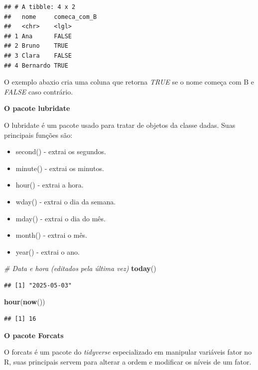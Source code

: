 \documentclass[
]{book}
\newenvironment{Shaded}{\begin{snugshade}}{\end{snugshade}}
\newcommand{\CommentTok}[1]{\textcolor[rgb]{0.56,0.35,0.01}{\textit{#1}}}
\newcommand{\FunctionTok}[1]{\textcolor[rgb]{0.13,0.29,0.53}{\textbf{#1}}}
\newcommand{\NormalTok}[1]{#1}
\providecommand{\tightlist}{%
  \setlength{\itemsep}{0pt}\setlength{\parskip}{0pt}}
\begin{document}
\begin{verbatim}
## # A tibble: 4 x 2
##   nome     comeca_com_B
##   <chr>    <lgl>       
## 1 Ana      FALSE       
## 2 Bruno    TRUE        
## 3 Clara    FALSE       
## 4 Bernardo TRUE
\end{verbatim}

O exemplo abaxio cria uma coluna que retorna \emph{TRUE} se o nome começa com B e \emph{FALSE} caso contrário.

\textbf{O pacote lubridate}

O lubridate é um pacote usado para tratar de objetos da classe dadas. Suas principais funções são:

\begin{itemize}
\tightlist
\item
  second() - extrai os segundos.
\item
  minute() - extrai os minutos.
\item
  hour() - extrai a hora.
\item
  wday() - extrai o dia da semana.
\item
  mday() - extrai o dia do mês.
\item
  month() - extrai o mês.
\item
  year() - extrai o ano.
\end{itemize}

\begin{Shaded}
\begin{Highlighting}[]
\CommentTok{\# Data e hora (editados pela última vez)}
\FunctionTok{today}\NormalTok{()}
\end{Highlighting}
\end{Shaded}

\begin{verbatim}
## [1] "2025-05-03"
\end{verbatim}

\begin{Shaded}
\begin{Highlighting}[]
\FunctionTok{hour}\NormalTok{(}\FunctionTok{now}\NormalTok{())}
\end{Highlighting}
\end{Shaded}

\begin{verbatim}
## [1] 16
\end{verbatim}

\textbf{O pacote Forcats}

O forcats é um pacote do \emph{tidyverse} especializado em manipular variáveis fator no R, suas principais servem para alterar a ordem e modificar os níveis de um fator.
\end{document}
